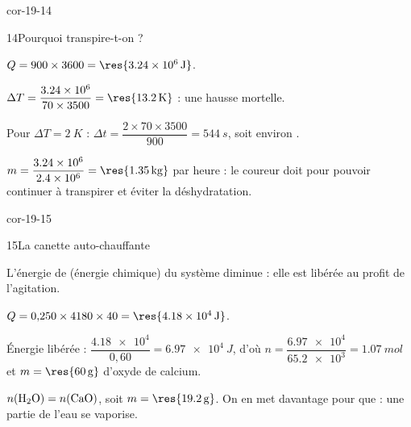 \begin{blocLivre}{cor-19-14}
\begin{corrige}{14}{Pourquoi transpire-t-on ?}
\begin{questions}
\item $Q=900\times3600=\res{\qty{3,24e6}{J}}$.
\item $\Delta T=\dfrac{\num{3.24e6}}{70\times3500}=\res{\qty{13,2}{K}}$ : une hausse mortelle.
\item Pour $\Delta T=\qty{2}{K}$ : $\Delta t=\dfrac{2\times70\times3500}{900}=\qty{544}{s}$, soit environ .
\item $m=\dfrac{\num{3.24e6}}{\num{2.4e6}}=\res{\qty{1,35}{kg}}$ par heure : le coureur doit 
pour pouvoir continuer à transpirer et éviter la déshydratation.
\end{questions}
\end{corrige}
\end{blocLivre}
\begin{blocLivre}{cor-19-15}
\begin{corrige}{15}{La canette auto-chauffante}
\begin{questions}
\item L'énergie de  (énergie chimique) du système diminue : elle est libérée au profit de l'agitation.
\item $Q=0{,}250\times4180\times40=\res{\qty{4,18e4}{J}}$.
\item Énergie libérée : $\dfrac{\num{4.18e4}}{0{,}60}=\qty{6,97e4}{J}$, d'où $n=\dfrac{\num{6.97e4}}{\num{65.2e3}}=\qty{1,07}{mol}$ et
$m=\res{\qty{60}{g}}$ d'oxyde de calcium.
\item $n(\ce{H2O})=n(\ce{CaO})$, soit $m=\res{\qty{19,2}{g}}$. On en met davantage pour que  :
une partie de l'eau se vaporise.
\end{questions}
\end{corrige}
\end{blocLivre}
